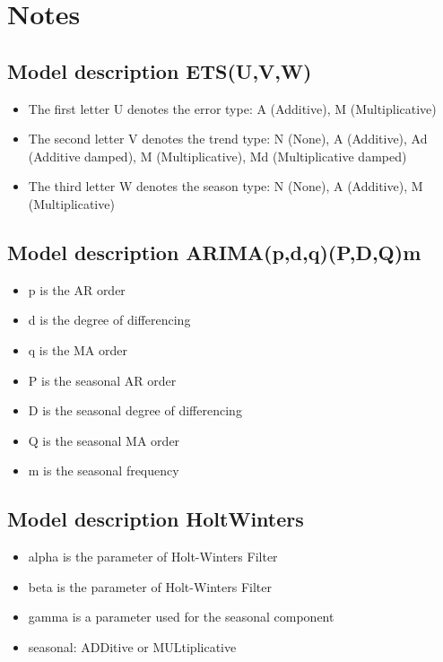 \documentclass[10pt,a4paper]{article}\usepackage[]{graphicx}\usepackage[]{color}
\begin{document}
\tableofcontents

\newpage

\section{Notes}

\subsection{Model description ETS(U,V,W)}
\begin{itemize}
  \item The first letter U denotes the error type: A (Additive), M (Multiplicative)
  \item The second letter V denotes the trend type: N (None), A (Additive), Ad (Additive damped), M (Multiplicative), Md (Multiplicative damped)
  \item The third letter W denotes the season type: N (None), A (Additive), M (Multiplicative)
\end{itemize}

\subsection{Model description ARIMA(p,d,q)(P,D,Q)m}
\begin{itemize}
  \item p is the AR order
  \item d is the degree of differencing
  \item q is the MA order
  \item P is the seasonal AR order
  \item D is the seasonal degree of differencing
  \item Q is the seasonal MA order
  \item m is the seasonal frequency
\end{itemize}

\subsection{Model description HoltWinters}
\begin{itemize}
  \item alpha is the parameter of Holt-Winters Filter
  \item beta is the parameter of Holt-Winters Filter
  \item gamma is a parameter used for the seasonal component
  \item seasonal: ADDitive or MULtiplicative

\end{itemize}
\end{document}
